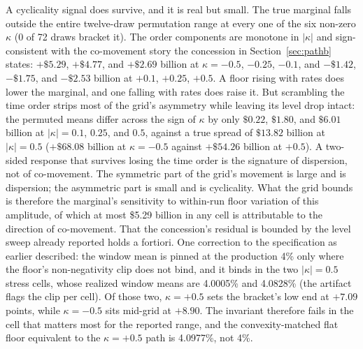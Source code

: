 \documentclass[12pt]{article}
\begin{document}
A cyclicality signal does survive, and it is real but small. The true marginal falls outside the entire twelve-draw permutation range at every one of the six non-zero $\kappa$ (0 of 72 draws bracket it). The order components are monotone in $|\kappa|$ and sign-consistent with the co-movement story the concession in Section~\ref{sec:pathb} states: $+\$5.29$, $+\$4.77$, and $+\$2.69$ billion at $\kappa = -0.5$, $-0.25$, $-0.1$, and $-\$1.42$, $-\$1.75$, and $-\$2.53$ billion at $+0.1$, $+0.25$, $+0.5$. A floor rising with rates does lower the marginal, and one falling with rates does raise it. But scrambling the time order strips most of the grid's asymmetry while leaving its level drop intact: the permuted means differ across the sign of $\kappa$ by only $\$0.22$, $\$1.80$, and $\$6.01$ billion at $|\kappa| = 0.1$, $0.25$, and $0.5$, against a true spread of $\$13.82$ billion at $|\kappa| = 0.5$ ($+\$68.08$ billion at $\kappa = -0.5$ against $+\$54.26$ billion at $+0.5$). A two-sided response that survives losing the time order is the signature of dispersion, not of co-movement. The symmetric part of the grid's movement is large and is dispersion; the asymmetric part is small and is cyclicality. What the grid bounds is therefore the marginal's sensitivity to within-run floor variation of this amplitude, of which at most \$5.29 billion in any cell is attributable to the direction of co-movement. That the concession's residual is bounded by the level sweep already reported holds a fortiori. One correction to the specification as earlier described: the window mean is pinned at the production 4\% only where the floor's non-negativity clip does not bind, and it binds in the two $|\kappa| = 0.5$ stress cells, whose realized window means are 4.0005\% and 4.0828\% (the artifact flags the clip per cell). Of those two, $\kappa = +0.5$ sets the bracket's low end at $+7.09$ points, while $\kappa = -0.5$ sits mid-grid at $+8.90$. The invariant therefore fails in the cell that matters most for the reported range, and the convexity-matched flat floor equivalent to the $\kappa = +0.5$ path is 4.0977\%, not 4\%.
\end{document}
